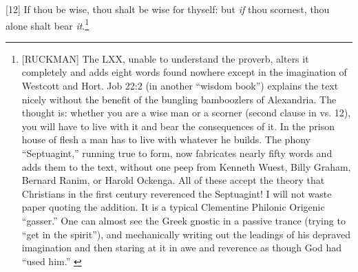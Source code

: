 [12] \textcolor[rgb]{0.00,0.00,1.00}{If thou be wise, thou shalt be wise for thyself: but \emph{if} thou scornest, thou alone shalt bear \emph{it}.}\footnote{[RUCKMAN] The LXX, unable to understand the proverb, alters it completely and adds eight words found nowhere except in the imagination of Westcott and Hort. Job 22:2 (in another “wisdom book”) explains the text nicely without the benefit of the bungling bamboozlers of Alexandria. The thought is: whether you are a wise man or a scorner (second clause in vs. 12), you will have to live with it and bear the consequences of it. In the prison house of flesh a man has to live with whatever he builds. The phony “Septuagint,” running true to form, now fabricates nearly fifty words and adds them to the text, without one peep from Kenneth Wuest, Billy Graham, Bernard Ranim, or Harold Ockenga. All of these accept the theory that Christians in the first century reverenced the Septuagint! I will not waste paper quoting the addition. It is a typical Clementine Philonic Origenic “gasser.” One can almost see the Greek gnostic in a passive trance (trying to “get in the spirit”), and mechanically writing out the leadings of his depraved imagination and then staring at it in awe and reverence as though God had “used him.” \cite{Ruckman1972Proverbs}  }
